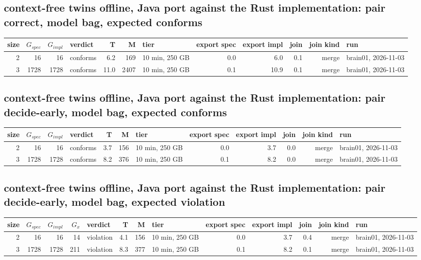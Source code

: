 \documentclass[10pt]{article}
\begin{document}
\subsection*{context-free twins offline, Java port against the Rust implementation: pair \textsf{correct}, model bag, expected conforms}
\begin{longtable}{@{}rrrlrrlrrrrl@{}}
\toprule
size & $G_{\mathit{spec}}$ & $G_{\mathit{impl}}$ & verdict & T & M & tier & export spec & export impl & join & join kind & run \\
\midrule
\endhead
\color{blue} 2 & 16 & 16 & conforms & 6.2 & 169 & 10 min, 250 GB & 0.0 & 6.0 & 0.1 & merge & brain01, 2026-11-03 \\
\color{blue} 3 & 1728 & 1728 & conforms & 11.0 & 2407 & 10 min, 250 GB & 0.1 & 10.9 & 0.1 & merge & brain01, 2026-11-03 \\
\bottomrule
\end{longtable}
\subsection*{context-free twins offline, Java port against the Rust implementation: pair \textsf{decide-early}, model bag, expected conforms}
\begin{longtable}{@{}rrrlrrlrrrrl@{}}
\toprule
size & $G_{\mathit{spec}}$ & $G_{\mathit{impl}}$ & verdict & T & M & tier & export spec & export impl & join & join kind & run \\
\midrule
\endhead
\color{blue} 2 & 16 & 16 & conforms & 3.7 & 156 & 10 min, 250 GB & 0.0 & 3.7 & 0.0 & merge & brain01, 2026-11-03 \\
\color{blue} 3 & 1728 & 1728 & conforms & 8.2 & 376 & 10 min, 250 GB & 0.1 & 8.2 & 0.0 & merge & brain01, 2026-11-03 \\
\bottomrule
\end{longtable}
\subsection*{context-free twins offline, Java port against the Rust implementation: pair \textsf{decide-early}, model bag, expected violation}
\begin{longtable}{@{}rrrrlrrlrrrrl@{}}
\toprule
size & $G_{\mathit{spec}}$ & $G_{\mathit{impl}}$ & $G_x$ & verdict & T & M & tier & export spec & export impl & join & join kind & run \\
\midrule
\endhead
\color{blue} 2 & 16 & 16 & 14 & violation & 4.1 & 156 & 10 min, 250 GB & 0.0 & 3.7 & 0.4 & merge & brain01, 2026-11-03 \\
\color{blue} 3 & 1728 & 1728 & 211 & violation & 8.3 & 377 & 10 min, 250 GB & 0.1 & 8.2 & 0.1 & merge & brain01, 2026-11-03 \\
\bottomrule
\end{longtable}
\end{document}
